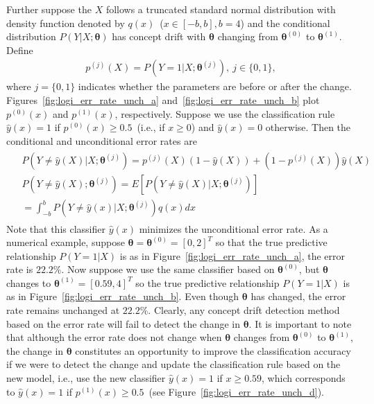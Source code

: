 \documentclass[twoside,11pt]{article}
\begin{document}
Further suppose the $X$ follows a truncated standard normal distribution with density function denoted by $q(x)$~($x\in[-b, b],b=4$) and the conditional distribution $P(Y|X;\bm{\theta})$ has concept drift with $\bm{\theta}$ changing from $\bm{\theta}^{(0)}$ to $\bm{\theta}^{(1)}$. Define 
\begin{align}
p^{(j)}(X)=P(Y=1|X;\bm{\theta}^{(j)}),~j\in\{0,1\},
\label{eqn:simp_nota_p}
\end{align}
where $j=\{0,1\}$ indicates whether the parameters are before or after the change. Figures~\ref{fig:logi_err_rate_unch_a} and~\ref{fig:logi_err_rate_unch_b} plot $p^{(0)}(x)$ and $p^{(1)}(x)$, respectively. Suppose we use the classification rule $\hat{y}(x)=1$ if $p^{(0)}(x)\geq 0.5$~(i.e., if $x\geq 0 $) and $\hat{y}(x)=0$ otherwise. Then the conditional and unconditional error rates are
\begin{align}
\begin{aligned}
&P(Y\neq\hat{y}(X)|X;\bm{\theta}^{(j)})
= p^{(j)}(X)(1-\hat{y}(X)) + (1-p^{(j)}(X))\hat{y}(X) \\
&P(Y\neq\hat{y}(X);\bm{\theta}^{(j)}) = E[P(Y\neq\hat{y}(X)|X;\bm{\theta}^{(j)})] \\ &= \int_{-b}^{b}P(Y\neq\hat{y}(x)|X;\bm{\theta}^{(j)})q(x)dx
\end{aligned}
\label{eqn:logi_err_rate}
\end{align}
Note that this classifier $\hat{y}(x)$ minimizes the unconditional error rate. As a numerical example, suppose $\bm{\theta} = \bm{\theta}^{(0)}=[0, 2]^T$ so that the true predictive relationship $P(Y=1|{X})$ is as in Figure~\ref{fig:logi_err_rate_unch_a}, the error rate is $22.2\%$. Now suppose we use the same classifier based on $\bm{\theta}^{(0)}$, but $\bm{\theta}$ changes to $\bm{\theta}^{(1)}=[0.59, 4]^T$ so the true predictive relationship $P(Y=1|{X})$ is as in Figure~\ref{fig:logi_err_rate_unch_b}. Even though $\bm{\theta}$ has changed, the error rate remains unchanged at $22.2\%$. Clearly, any concept drift detection method based on the error rate will fail to detect the change in $\bm{\theta}$. It is important to note that although the error rate does not change when $\bm{\theta}$ changes from $\bm{\theta}^{(0)}$ to $\bm{\theta}^{(1)}$, the change in $\bm{\theta}$ constitutes an opportunity to improve the classification accuracy if we were to detect the change and update the classification rule based on the new model, i.e., use the new classifier $\hat{y}(x)=1$ if $x \geq 0.59$, which corresponds to $\hat{y}(x)=1$ if $p^{(1)}(x)\geq 0.5$~(see Figure~\ref{fig:logi_err_rate_unch_d}).
\end{document}
